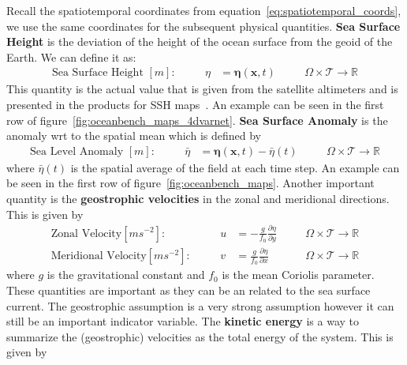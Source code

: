 




Recall the spatiotemporal coordinates from equation~\ref{eq:spatiotemporal_coords}, 
we use the same coordinates for the subsequent physical quantities. \textbf{Sea Surface Height} is the deviation of the height of the ocean surface from the geoid of the Earth. We can define it as:
%
\begin{align}
	\text{Sea Surface Height }[m]:&& \quad
 \eta &= \boldsymbol{\eta}(\mathbf{x},t)&& \quad \Omega\times \mathcal{T}\rightarrow\mathbb{R} \label{eq:ssh}
\end{align}
%
This quantity is the actual value that is given from the satellite altimeters and is presented in the products for SSH maps~\cite{DUACS}. An example can be seen in the first row of figure~\ref{fig:oceanbench_maps_4dvarnet}.
%
\textbf{Sea Surface Anomaly} is the anomaly wrt to the spatial mean which is defined by
%
\begin{align}
	\text{Sea Level Anomaly }[m]:&& \quad
 \bar{\eta} &= \boldsymbol{\eta}(\mathbf{x},t) - \bar{\eta}(t) &&
 \quad \Omega\times \mathcal{T}\rightarrow\mathbb{R} \label{eq:sla}
\end{align}
%
where $\bar{\eta}(t)$ is the spatial average of the field at each time step.  
An example can be seen in the first row of figure~\ref{fig:oceanbench_maps}.
%
Another important quantity is the \textbf{geostrophic velocities} in the zonal and meridional directions. This is given by
%
\begin{align}
	\text{Zonal Velocity}[ms^{-2}]:&& \quad
 u &= -\frac{g}{f_0}\frac{\partial \eta}{\partial y} &&
 \quad \Omega\times \mathcal{T}\rightarrow\mathbb{R} \label{eq:u_vel} \\
	\text{Meridional Velocity}[ms^{-2}]:&& \quad
 v &= \frac{g}{f_0}\frac{\partial \eta}{\partial x} &&
 \quad \Omega\times \mathcal{T}\rightarrow\mathbb{R} \label{eq:v_vel}
\end{align}
% 
where $g$ is the gravitational constant and $f_0$ is the mean Coriolis parameter. These quantities are important as they can be an related to the sea surface current. The geostrophic assumption is a very strong assumption however it can still be an important indicator variable. The \textbf{kinetic energy} is a way to summarize the (geostrophic) velocities as the total energy of the system. This is given by
